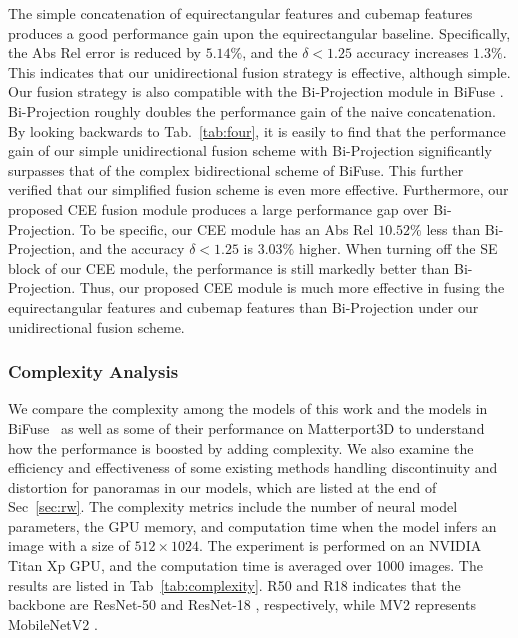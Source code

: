 \documentclass[letterpaper, 10 pt, conference]{ieeeconf}
\begin{document}
The simple concatenation of equirectangular features and cubemap features produces a good performance gain upon the equirectangular baseline. Specifically, the Abs Rel error is reduced by $5.14\%$, and the  $\delta<1.25$ accuracy increases $1.3\%$. 
This indicates that our unidirectional fusion strategy is effective, although simple. 
Our fusion strategy is also compatible with the Bi-Projection module in BiFuse \cite{wang2020bifuse}. Bi-Projection roughly doubles the performance gain of the naive concatenation. 
By looking backwards to Tab.~\ref{tab:four}, it is easily to find that the performance gain of our simple unidirectional fusion scheme with Bi-Projection significantly surpasses that of the complex bidirectional scheme of BiFuse. This further verified that our simplified fusion scheme is even more effective. 
Furthermore, our proposed CEE fusion module produces a large performance gap over Bi-Projection. To be specific, our CEE module has an Abs Rel $10.52\%$ less than Bi-Projection, and the accuracy $\delta<1.25$ is $3.03\%$ higher. When turning off the SE block of our CEE module, the performance is still markedly better than Bi-Projection. Thus, our proposed CEE module is much more effective in fusing the equirectangular features and cubemap features than Bi-Projection under our unidirectional fusion scheme. 


\subsubsection{Complexity Analysis}
\label{sec:ca}
We compare the complexity among the models of this work and the models in BiFuse~\cite{wang2020bifuse} as well as some of their performance on Matterport3D to understand how the performance is boosted by adding complexity. 
{We also examine the efficiency and effectiveness of some existing methods handling discontinuity and distortion for panoramas in our models, which are listed at the end of Sec~\ref{sec:rw}. }
The complexity metrics include the number of {neural} model parameters, the GPU memory, and computation time when the model infers an image with a size of $512\times1024$.
The experiment is performed on {an NVIDIA Titan Xp GPU}, and the computation time is averaged over 1000 images. {The results are listed in Tab~\ref{tab:complexity}.} R50 and R18 indicates that the backbone are ResNet-50 and ResNet-18 \cite{he2016deep}, respectively, while MV2 represents MobileNetV2 \cite{sandler2018mobilenetv2}. 
\end{document}
